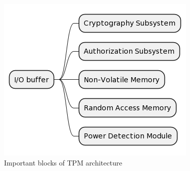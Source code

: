 \begin{figure}[h]
    \centering
    \includegraphics[width=\textwidth-6cm]{img/tpm-arch-diagram.png}
    \caption{Important blocks of TPM architecture}
    \label{fig:tpm-arch-scheme}
\end{figure}

